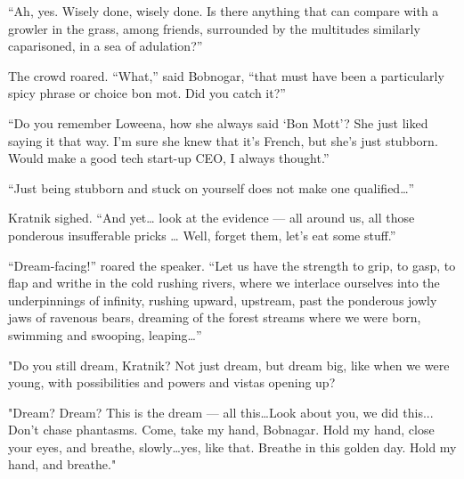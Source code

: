 ``Ah, yes. Wisely done, wisely done. Is there anything that can compare
with a growler in the grass, among friends, surrounded by the multitudes
similarly caparisoned, in a sea of adulation?''

The crowd roared. ``What,'' said Bobnogar, ``that must have been a
particularly spicy phrase or choice bon mot. Did you catch it?''

``Do you remember Loweena, how she always said `Bon Mott'? She just
liked saying it that way. I'm sure she knew that it's French, but she's
just stubborn. Would make a good tech start-up CEO, I always thought.''

``Just being stubborn and stuck on yourself does not make one
qualified\ldots{}''

Kratnik sighed. ``And yet\ldots{} look at the evidence --- all around us,
all those ponderous insufferable pricks \ldots{} Well, forget them,
let's eat some stuff.''

``Dream-facing!'' roared the speaker. ``Let us have the strength to
grip, to gasp, to flap and writhe in the cold rushing rivers, where we
interlace ourselves into the underpinnings of infinity, rushing upward,
upstream, past the ponderous jowly jaws of ravenous bears, dreaming of
the forest streams where we were born, swimming and swooping,
leaping\ldots{}''

"Do you still dream, Kratnik? Not just dream, but dream big, like when
we were young, with possibilities and powers and vistas opening up?

"Dream? Dream? This is the dream --- all this\ldots Look about you, we did
this... Don't chase phantasms. Come, take my hand, Bobnagar. Hold my
hand, close your eyes, and breathe, slowly\ldots yes, like that. Breathe in
this golden day. Hold my hand, and breathe."
